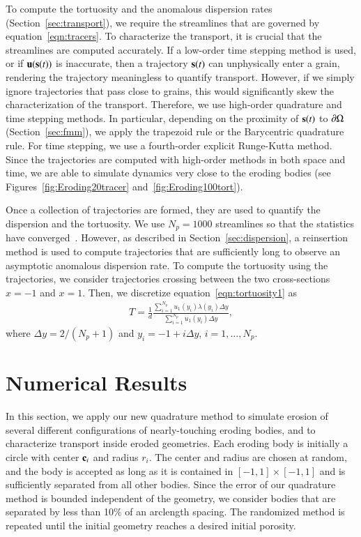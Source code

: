 \documentclass[preprint,10pt]{elsarticle}
\begin{document}
To compute the tortuosity and the anomalous dispersion rates
(Section~\ref{sec:transport}), we require the streamlines that are
governed by equation~\eqref{eqn:tracers}.  To characterize the
transport, it is crucial that the streamlines are computed accurately.
If a low-order time stepping method is used, or if $\uu(\ss(t))$ is
inaccurate, then a trajectory $\ss(t)$ can unphysically enter a grain,
rendering the trajectory meaningless to quantify transport.  However, if
we simply ignore trajectories that pass close to grains, this would
significantly skew the characterization of the transport. Therefore, we
use high-order quadrature and time stepping methods.  In particular,
depending on the proximity of $\ss(t)$ to $\bd\Omega$
(Section~\ref{sec:fmm}), we apply the trapezoid rule or the Barycentric
quadrature rule.  For time stepping, we use a fourth-order explicit
Runge-Kutta method.  Since the trajectories are computed with high-order
methods in both space and time,  we are able to simulate dynamics very
close to the eroding bodies (see Figures~\ref{fig:Eroding20tracer}
and~\ref{fig:Eroding100tort}).

Once a collection of trajectories are formed, they are used to quantify
the dispersion and the tortuosity.  We use $N_p = 1000$ streamlines so
that the statistics have converged~\cite{bel-sal-rin1992}.  However, as
described in Section~\ref{sec:dispersion}, a reinsertion method is used
to compute trajectories that are sufficiently long to observe an
asymptotic anomalous dispersion rate.  To compute the tortuosity using
the trajectories, we consider trajectories crossing between the two
cross-sections $x=-1$ and $x=1$.  Then, we discretize
equation~\eqref{eqn:tortuosity1} as
\begin{align}
  T = \frac{1}{d}\frac{\displaystyle\sum_{i=1}^{N_p} 
    u_1(y_i) \lambda(y_i) \Delta y}
  {\displaystyle\sum_{i=1}^{N_p} u_1(y_i) \Delta y}, 
\end{align}
where $\Delta y = 2/(N_p + 1)$ and $y_i = -1 + i \Delta y$,
$i=1,\ldots,N_p$.  

\section{Numerical Results}
\label{sec:results}
In this section, we apply our new quadrature method to simulate
erosion of several different configurations of nearly-touching eroding
bodies, and to characterize transport inside eroded geometries.  Each
eroding body is initially a circle with center $\cc_i$ and radius $r_i$.
The center and radius are chosen at random, and the body is accepted as
long as it is contained in $[-1,1] \times [-1,1]$ and is sufficiently
separated from all other bodies.  Since the error of our quadrature
method is bounded independent of the geometry, we consider bodies that
are separated by less than 10\% of an arclength spacing.  The randomized
method is repeated until the initial geometry reaches a desired initial
porosity.
\end{document}
